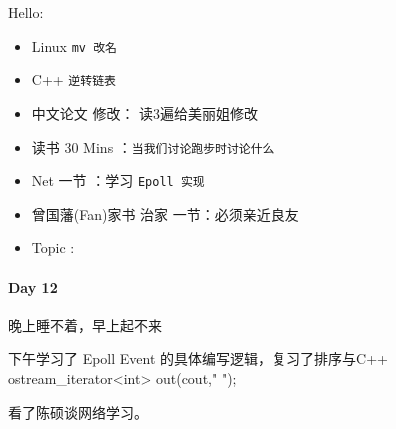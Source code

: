 \documentclass[UTF8,a4paper,8pt]{ctexart}
\begin{document}
	 	  Hello:
	 	  \begin{itemize}[itemindent = 1em]
	 	  	\renewcommand\labelitemi{\makebox[0pt][l]{$\square$}\hspace{1em}} 
	 	  	\renewcommand\labelitemi{\makebox[0pt][l]{$\square$}\raisebox{.15ex}{\hspace{0.1em}$\checkmark$}}	 	
	 	  	\item   Linux \verb|mv 改名|
	 	  	\item   C++   \verb|逆转链表|
	 	  	\item   中文论文 修改： 读3遍给美丽姐修改
	 	  	
	 	  	\item   读书  30 Mins	：\verb|当我们讨论跑步时讨论什么|
	 	  	\item   Net 一节 ：学习 \verb|Epoll 实现|	
	 	  	\renewcommand\labelitemi{\makebox[0pt][l]{$\square$}\hspace{1em}} 
	 	  	
	 	  	
	 	  	\renewcommand\labelitemi{\makebox[0pt][l]{$\square$}\raisebox{.15ex}{\hspace{0.1em}$\checkmark$}}
	 	  	\item   曾国藩(Fan)家书 治家 一节：必须亲近良友
	 	  	\item   Topic :
	 	  \end{itemize}
 	 \paragraph{Day 12      \quad     }
	 	 晚上睡不着，早上起不来
	 	 
	 	 下午学习了 Epoll Event 的具体编写逻辑，复习了排序与C++ ostream\_iterator<int> out(cout," ");
	 	 
	 	 看了陈硕谈网络学习。
	 	 
\end{document}
